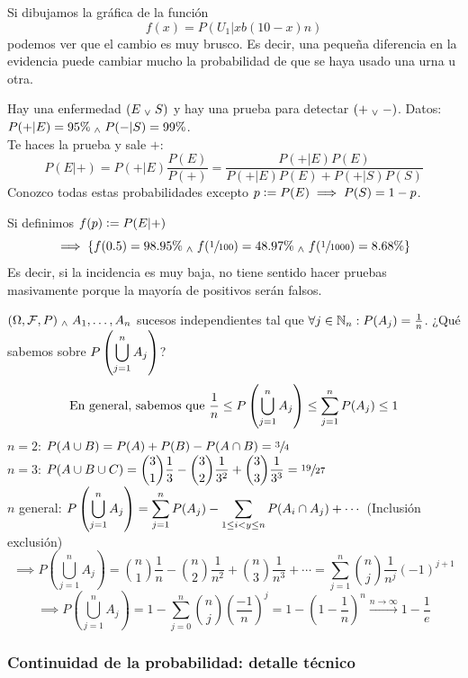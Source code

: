 Si dibujamos la gráfica de la función \[ f(x)=P(U_1 | xb(10-x)n)\] podemos ver que el cambio es muy brusco. Es decir, una pequeña diferencia en la evidencia puede cambiar mucho la probabilidad de que se haya usado una urna u otra.



\begin{ejem}
	Hay una enfermedad $(E \; _{\vee} \; S)$ y hay una prueba para detectar $(+ \; _{\vee} \; -)$. Datos: $P(+ | E)=95\% \; _{\wedge} \; P(-| S)=99\%$.\\
	Te haces la prueba y sale $+$:
	\[P(E|+)=P(+|E)\frac{P(E)}{P(+)}=\frac{P(+|E)P(E)}
		{P(+|E)P(E)+P(+|S)P(S)}\]
	Conozco todas estas probabilidades excepto $p\vcentcolon= P(E) \implies P(S)=1-p$.
\end{ejem}
\begin{figure}
	\vspace{-0.85cm}
	
\end{figure}
Si definimos $f(p)\vcentcolon= P(E|+)$ \[\implies \{f(0.5)=98.95\% \; _{\wedge} \; f(\sfrac{1}{100}) = 48.97\%\; _{\wedge} \; f(\sfrac{1}{1000}) = 8.68\% \}\]
Es decir, si la incidencia es muy baja, no tiene sentido hacer pruebas masivamente porque la mayoría de positivos serán falsos.

\begin{ejem}
	$(\Omega, \mathcal{F}, P) \; _{\wedge} \; A_1, \dots, A_n$ sucesos independientes tal que $\forall j \in \mathbb{N}_n : P(A_j)=\frac{1}{n}$. ¿Qué sabemos sobre $\displaystyle P\left(\bigcup_{j=1}^n A_j\right)$?
	\[\text{En general, sabemos que } \frac{1}{n}\leq P\left(\bigcup_{j=1}^n A_j\right) \leq \sum_{j=1}^nP(A_j)\leq 1\]
	$n=2$: $\displaystyle P(A\cup B)=P(A)+P(B)-P(A\cap B)=\sfrac{3}{4}$ \\
	$n=3$: $\displaystyle P(A\cup B\cup C)=\binom{3}{1}\frac{1}{3}-\binom{3}{2}\frac{1}{3^2}+\binom{3}{3}\frac{1}{3^3}=\sfrac{19}{27}$ \\
	$n$ general: $\displaystyle P\left(\bigcup_{j=1}^n A_j\right)=\sum_{j=1}^nP(A_j)-\sum_{1\leq i<y\leq n} P(A_i\cap A_j) + \cdots$ (Inclusión exclusión)
	\[\implies P\left(\bigcup_{j=1}^n A_j\right)= \binom{n}{1}\frac{1}{n} - \binom{n}{2}\frac{1}{n^2} + \binom{n}{3}\frac{1}{n^3} + \cdots=\sum_{j=1}^n\binom{n}{j}\frac{1}{n^j}(-1)^{j+1}\]
	\[\implies P\left(\bigcup_{j=1}^n A_j\right)= 1-\sum_{j=0}^n\binom{n}{j}\left(\frac{-1}{n}\right)^j=1-\left(1-\frac{1}{n}\right)^n\xrightarrow{n\rightarrow\infty}1-\frac{1}{e}\]
\end{ejem}

\subsubsection{Continuidad de la probabilidad: detalle técnico}

